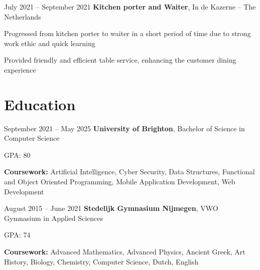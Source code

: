 	\vspace{0.2 cm}
	
	\begin{twocolentry}{
			July 2021 – September 2021
		}
		\textbf{Kitchen porter and Waiter}, In de Kazerne -- The Netherlands\end{twocolentry}
	
	\vspace{0.10 cm}
	\begin{onecolentry}
		\begin{highlights}
			\item Progressed from kitchen porter to waiter in a short period of time due to strong work ethic and quick learning
			\item Provided friendly and efficient table service, enhancing the customer dining experience
		\end{highlights}
	\end{onecolentry}
	
	\section{Education}
	
	\begin{twocolentry}{
			September 2021 – May 2025
		}
		\textbf{University of Brighton}, Bachelor of Science in Computer Science\end{twocolentry}
	
	\vspace{0.10 cm}
	\begin{onecolentry}
		\begin{highlights}
			\item GPA: 80
			\item \textbf{Coursework:} Artificial Intelligence, Cyber Security, Data Structures, Functional and Object Oriented Programming, Mobile Application Development, Web Development
		\end{highlights}
	\end{onecolentry}
	
	\vspace{0.2 cm}
	
	\begin{twocolentry}{
			August 2015 – June 2021
		}
		\textbf{Stedelijk Gymnasium Nijmegen}, VWO Gymnasium in Applied Sciences\end{twocolentry}
	
	\vspace{0.10 cm}
	\begin{onecolentry}
		\begin{highlights}
			\item GPA: 74
			\item \textbf{Coursework:} Advanced Mathematics, Advanced Physics, Ancient Greek, Art History, Biology, Chemistry, Computer Science, Dutch, English
		\end{highlights}
	\end{onecolentry}
	
